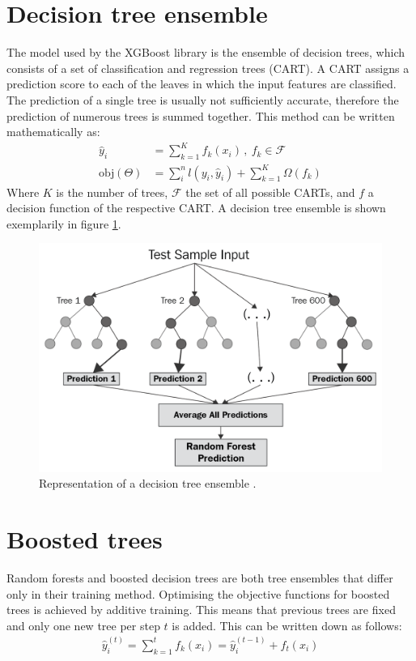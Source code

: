 \section{Decision tree ensemble}
The model used by the XGBoost library is the ensemble of decision trees, which consists of a set of classification and regression trees (CART).
A CART assigns a prediction score to each of the leaves in which the input features are classified. The prediction of a single tree is usually not sufficiently accurate,
therefore the prediction of numerous trees is summed together. This method can be written mathematically as:
\begin{align}
  \hat{y}_i &= \sum_{k=1}^K f_k(x_i)\,, \: f_k \in \mathcal{F} \\
  \text{obj}(\Theta) &= \sum_i^n l(y_i, \hat{y}_i) + \sum_{k=1}^K \Omega(f_k)
\end{align}
Where $K$ is the number of trees, $\mathcal{F}$ the set of all possible CARTs, and $f$ a decision function of the respective CART. A decision tree ensemble is shown exemplarily in
figure \ref{fig:random_forest}.

\begin{figure}
  \centering
  \includegraphics[height=0.6\textwidth]{images/random_forest.png}
  \caption{Representation of a decision tree ensemble \cite{random_forest}.}
  \label{fig:random_forest}
\end{figure}

\section{Boosted trees}
Random forests and boosted decision trees are both tree ensembles that differ only in their training method.
Optimising the objective functions for
boosted trees is achieved by additive training. This means that previous trees are fixed and only one new tree per step $t$ is added. This can be written
down as follows:
\begin{align}
  \hat{y}_i^{(t)} = \sum_{k=1}^t f_k(x_i) = \hat{y}_i^{(t-1)} + f_t(x_i)
\end{align}

